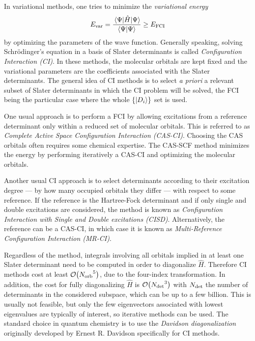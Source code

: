 \documentclass[./thesis.tex]{subfiles}
\begin{document}
In variational methods, one tries to minimize the \emph{variational energy}
\begin{equation}
E_\text{var} = \frac{\mel{\Psi}{\hat{H}}{\Psi}}{\braket{\Psi}{\Psi}} \ge E_\text{FCI}
\label{eq:evar}
\end{equation}
by optimizing the parameters of the wave function.
Generally speaking, solving Schrö\-dinger's equation in a basis of Slater determinants is called \emph{Configuration Interaction (CI)}.
In these methods, the molecular orbitals are kept fixed and the variational parameters are the coefficients associated with the Slater determinants.
The general idea of CI methods is to select \textit{a priori} a relevant subset
of Slater determinants in which the CI problem will be solved, the FCI being
the particular case where the whole $\{\ket {D_i} \}$ set is used.

One usual approach is to perform a FCI by allowing excitations from a reference determinant only within a reduced set of molecular orbitals. This is referred to as \emph{Complete Active Space Configuration Interaction (CAS-CI)}. Choosing the CAS orbitals often requires some chemical expertise. The CAS-SCF method minimizes the energy by performing iteratively a CAS-CI and optimizing the molecular orbitals.

Another usual CI approach is to select determinants according to their excitation degree --- by how many occupied orbitals they differ --- with respect to some reference. If the reference is the Hartree-Fock determinant and if only single and double excitations are considered, the method is known as \emph{Configuration Interaction with Single and Double excitations (CISD)}. Alternatively, the reference can be a CAS-CI, in which case it is known as \emph{Multi-Reference Configuration Interaction (MR-CI)}.

Regardless of the method, integrals involving all orbitals implied in at least one Slater determinant need to be computed in order to diagonalize $\widehat{H}$. Therefore CI methods cost at least $\order{\Norb^5}$, due to the four-index transformation.
In addition, the cost for fully diagonalizing $\widehat{H}$ is $\order{\Ndet^3}$ with ${N_\text{det}}$ the number of determinants in the considered subspace, which can be up to a few billion. This is usually not feasible, but only the few eigenvectors associated with lowest eigenvalues are typically of interest, so iterative methods can be used. The standard choice in quantum chemistry is to use the \emph{Davidson diagonalization} originally developed by Ernest R. Davidson\cite{Davidson_1975} specifically for CI methods. 
\end{document}
